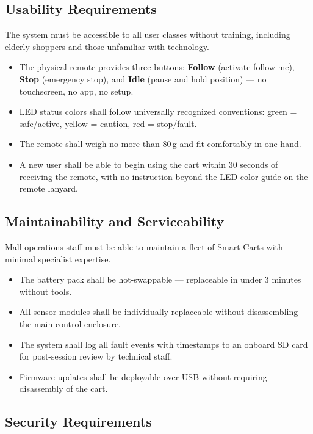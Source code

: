 \subsection{Usability Requirements}

The system must be accessible to all user classes without training,
including elderly shoppers and those unfamiliar with technology.
\begin{itemize}
  \item The physical remote provides three buttons: \textbf{Follow} (activate follow-me), \textbf{Stop} (emergency stop), and \textbf{Idle} (pause and hold position) --- no touchscreen, no app, no setup.
  \item LED status colors shall follow universally recognized conventions: green = safe/active, yellow = caution, red = stop/fault.
  \item The remote shall weigh no more than 80\,g and fit comfortably in one hand.
  \item A new user shall be able to begin using the cart within 30 seconds of receiving the remote, with no instruction beyond the LED color guide on the remote lanyard.
\end{itemize}

\subsection{Maintainability and Serviceability}

Mall operations staff must be able to maintain a fleet of Smart Carts
with minimal specialist expertise.
\begin{itemize}
  \item The battery pack shall be hot-swappable --- replaceable in under 3 minutes without tools.
  \item All sensor modules shall be individually replaceable without disassembling the main control enclosure.
  \item The system shall log all fault events with timestamps to an onboard SD card for post-session review by technical staff.
  \item Firmware updates shall be deployable over USB without requiring disassembly of the cart.
\end{itemize}

\subsection{Security Requirements}

